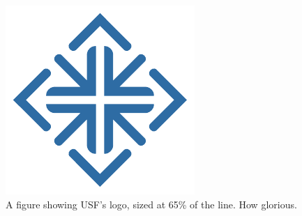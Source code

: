 \documentclass{proc}
\begin{document}
\begin{figure}[h!] %
    \centering

    \includegraphics[width=0.65\linewidth]{usf-blue.pdf}
    \caption{A figure showing USF's logo, sized at 65\% of the line. How glorious.}
    \label{fig:usf-logo}
\end{figure}


 
\end{document}

